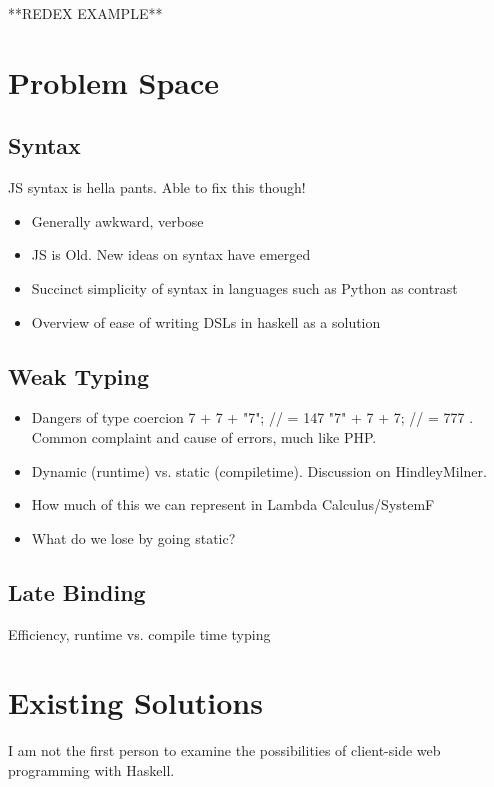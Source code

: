 \documentclass[11pt]{article}
\begin{document}
**REDEX EXAMPLE**

\section{Problem Space}

\subsection{Syntax}
JS syntax is hella pants. Able to fix this though!
\begin{itemize}
\item Generally awkward, verbose
\item JS is Old. New ideas on syntax have emerged
\item Succinct simplicity of syntax in languages such as Python as contrast
\item Overview of ease of writing DSLs in haskell as a solution
\end{itemize}


\subsection{Weak Typing}
\begin{itemize}
\item Dangers of type coercion 7 + 7 + "7"; // = 147  "7" + 7 + 7; // = 777 . 
	  Common complaint and cause of errors, much like PHP.
\item Dynamic (runtime) vs. static (compiletime). Discussion on HindleyMilner.
\item How much of this we can represent in Lambda Calculus/SystemF
\item What do we lose by going static?
\end{itemize}



\subsection{Late Binding}
Efficiency, runtime vs. compile time typing

\pagebreak

\section{Existing Solutions}
I am not the first person to examine the possibilities of client-side web
programming with Haskell.  
\end{document}
